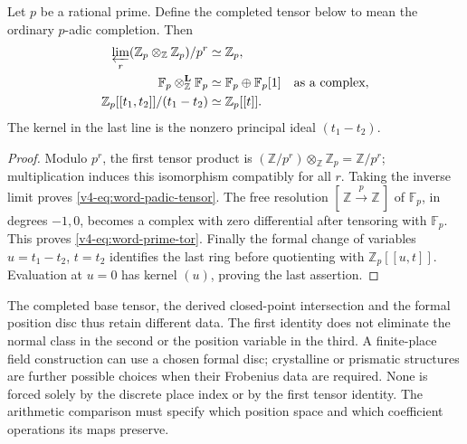 \begin{proposition}
\label{v4-prop:word-finite-place-models}
Let \(p\) be a rational prime. Define the completed tensor below
to mean the ordinary \(p\)-adic completion. Then
\begin{align}
 \varprojlim_r
  (\mathbb Z_p\otimes_{\mathbb Z}\mathbb Z_p)/p^r
       &\simeq\mathbb Z_p,\label{v4-eq:word-padic-tensor}\\
 \mathbb F_p\otimes_{\mathbb Z}^{\mathbf L}\mathbb F_p
       &\simeq\mathbb F_p\oplus\mathbb F_p[1]
          \quad\text{as a complex},\label{v4-eq:word-prime-tor}\\
 \mathbb Z_p[[t_1,t_2]]/(t_1-t_2)
       &\simeq\mathbb Z_p[[t]].\label{v4-eq:word-padic-position}
\end{align}
The kernel in the last line is the nonzero principal ideal
\((t_1-t_2)\).
\end{proposition}

\begin{proof}
Modulo \(p^r\), the first tensor product is
\((\mathbb Z/p^r)\otimes_{\mathbb Z}\mathbb Z_p
 =\mathbb Z/p^r\); multiplication induces this isomorphism
compatibly for all \(r\). Taking the inverse limit proves
\eqref{v4-eq:word-padic-tensor}. The free resolution
\([\,\mathbb Z\xrightarrow{p}\mathbb Z\,]\) of \(\mathbb F_p\),
in degrees \(-1,0\), becomes a complex with zero differential
after tensoring with \(\mathbb F_p\). This proves
\eqref{v4-eq:word-prime-tor}. Finally the formal change of
variables \(u=t_1-t_2\), \(t=t_2\) identifies the last ring
before quotienting with \(\mathbb Z_p[[u,t]]\). Evaluation at
\(u=0\) has kernel \((u)\), proving the last assertion.
\end{proof}

The completed base tensor, the derived closed-point intersection
and the formal position disc thus retain different data. The
first identity does not eliminate the normal class in the second
or the position variable in the third. A finite-place field
construction can use a chosen formal disc; crystalline or
prismatic structures are further possible choices when their
Frobenius data are required. None is forced solely by the discrete
place index or by the first tensor identity. The arithmetic
comparison must specify which position space and which coefficient
operations its maps preserve.
